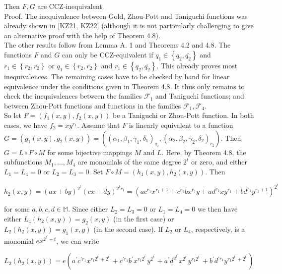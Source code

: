 \documentclass[10pt]{article}
\begin{document}
Then $F, G$ are CCZ-inequivalent.\\[0pt]
Proof. The inequivalence between Gold, Zhou-Pott and Taniguchi functions was already shown in [KZ21, KZ22] (although it is not particularly challenging to give an alternative proof with the help of Theorem 4.8).\\
The other results follow from Lemma A. 1 and Theorems 4.2 and 4.8. The functions $F$ and $G$ can only be CCZ-equivalent if $q_{1} \in\left\{q_{2}, \overline{q_{2}}\right\}$ and $r_{1} \in\left\{r_{2}, \overline{r_{2}}\right\}$ or $q_{1} \in\left\{r_{2}, \overline{r_{2}}\right\}$ and $r_{1} \in\left\{q_{2}, \overline{q_{2}}\right\}$. This already proves most inequivalences. The remaining cases have to be checked by hand for linear equivalence under the conditions given in Theorem 4.8. It thus only remains to check the inequivalences between the families $\mathcal{F}_{1}$ and Taniguchi functions; and between Zhou-Pott functions and functions in the families $\mathcal{F}_{1}, \mathcal{F}_{4}$.\\
So let $F=\left(f_{1}(x, y), f_{2}(x, y)\right)$ be a Taniguchi or Zhou-Pott function. In both cases, we have $f_{2}=x y^{r_{1}}$. Assume that $F$ is linearly equivalent to a function $G=\left(g_{1}(x, y), g_{2}(x, y)\right)= \left(\left(\alpha_{1}, \beta_{1}, \gamma_{1}, \delta_{1}\right)_{q_{2}},\left(\alpha_{2}, \beta_{2}, \gamma_{2}, \delta_{2}\right)_{r_{2}}\right)$. Then $G=L \circ F \circ M$ for some bijective mappings $M$ and $L$. Here, by Theorem 4.8, the subfunctions $M_{1}, \ldots, M_{4}$ are monomials of the same degree $2^{t}$ or zero, and either $L_{1}=L_{4}=0$ or $L_{2}=L_{3}=0$. Set $F \circ M=\left(h_{1}(x, y), h_{2}(x, y)\right)$. Then

$$
h_{2}(x, y)=(a x+b y)^{2^{t}}(c x+d y)^{2^{t} r_{1}}=\left(a c^{r_{1}} x^{r_{1}+1}+c^{r_{1}} b x^{r_{1}} y+a d^{r_{1}} x y^{r_{1}}+b d^{r_{1}} y^{r_{1}+1}\right)^{2^{t}}
$$

for some $a, b, c, d \in \mathbb{M}$. Since either $L_{2}=L_{3}=0$ or $L_{1}=L_{4}=0$ we then have either $L_{4}\left(h_{2}(x, y)\right)=g_{2}(x, y)$ (in the first case) or $L_{2}\left(h_{2}(x, y)\right)=g_{1}(x, y)$ (in the second case). If $L_{2}$ or $L_{4}$, respectively, is a monomial $e x^{2^{t^{\prime}}-t}$, we can write

$$
L_{2}\left(h_{2}(x, y)\right)=e\left(a^{\prime} c^{\prime r_{1}} x^{r_{1} 2^{t^{\prime}}+2^{t^{\prime}}}+c^{\prime r_{1}} b^{\prime} x^{r_{1} 2^{t^{\prime}}} y^{2^{t^{\prime}}}+a^{\prime} d^{2^{t^{\prime}}} x^{2^{t^{\prime}}} y^{r_{1} 2^{t^{\prime}}}+b^{\prime} d^{\prime r_{1}} y^{r_{1} 2^{t^{\prime}}+2^{t^{\prime}}}\right)
$$
\end{document}

